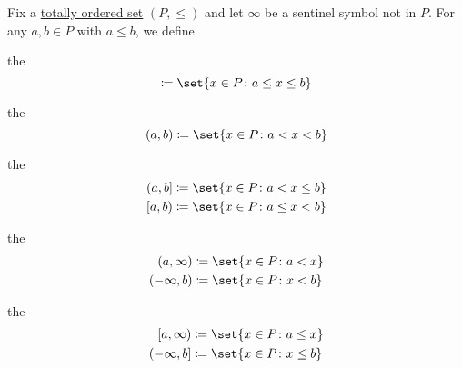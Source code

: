 \begin{definition}\label{def:total_order_interval}
  Fix a \hyperref[def:poset]{totally ordered set} \( (P, \leq) \) and let \( \infty \) be a sentinel symbol not in \( P \). For any \( a, b \in P \) with \( a \leq b \), we define
  \begin{thmenum}
     the 
    \begin{equation*}
      [a, b] \coloneqq \set{ x \in P \colon a \leq x \leq b }
    \end{equation*}

     the 
    \begin{equation*}
      (a, b) \coloneqq \set{ x \in P \colon a < x < b }
    \end{equation*}

     the 
    \begin{equation*}
      \begin{aligned}
        (a, b] &\coloneqq \set{ x \in P \colon a < x \leq b }
        \\
        [a, b) &\coloneqq \set{ x \in P \colon a \leq x < b }
      \end{aligned}
    \end{equation*}

     the 
    \begin{equation*}
      \begin{aligned}
        (a, \infty)  &\coloneqq \set{ x \in P \colon a < x }
        \\
        (-\infty, b) &\coloneqq \set{ x \in P \colon x < b }
      \end{aligned}
    \end{equation*}

     the 
    \begin{equation*}
      \begin{aligned}
        [a, \infty)  &\coloneqq \set{ x \in P \colon a \leq x }
        \\
        (-\infty, b] &\coloneqq \set{ x \in P \colon x \leq b }
      \end{aligned}
    \end{equation*}
  \end{thmenum}
\end{definition}


